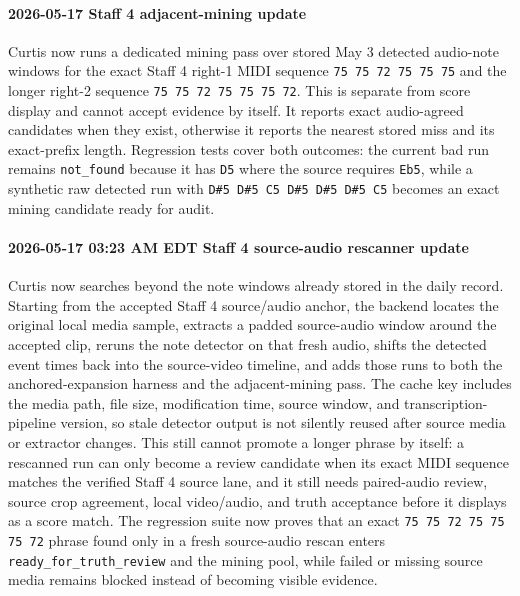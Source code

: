 \paragraph{2026-05-17 Staff 4 adjacent-mining update} Curtis now runs a dedicated mining pass over stored May 3 detected audio-note windows for the exact Staff 4 right-1 MIDI sequence \texttt{75 75 72 75 75 75} and the longer right-2 sequence \texttt{75 75 72 75 75 75 72}. This is separate from score display and cannot accept evidence by itself. It reports exact audio-agreed candidates when they exist, otherwise it reports the nearest stored miss and its exact-prefix length. Regression tests cover both outcomes: the current bad run remains \texttt{not\_found} because it has \texttt{D5} where the source requires \texttt{Eb5}, while a synthetic raw detected run with \texttt{D\#5 D\#5 C5 D\#5 D\#5 D\#5 C5} becomes an exact mining candidate ready for audit.

\paragraph{2026-05-17 03:23 AM EDT Staff 4 source-audio rescanner update} Curtis now searches beyond the note windows already stored in the daily record. Starting from the accepted Staff 4 source/audio anchor, the backend locates the original local media sample, extracts a padded source-audio window around the accepted clip, reruns the note detector on that fresh audio, shifts the detected event times back into the source-video timeline, and adds those runs to both the anchored-expansion harness and the adjacent-mining pass. The cache key includes the media path, file size, modification time, source window, and transcription-pipeline version, so stale detector output is not silently reused after source media or extractor changes. This still cannot promote a longer phrase by itself: a rescanned run can only become a review candidate when its exact MIDI sequence matches the verified Staff 4 source lane, and it still needs paired-audio review, source crop agreement, local video/audio, and truth acceptance before it displays as a score match. The regression suite now proves that an exact \texttt{75 75 72 75 75 75 72} phrase found only in a fresh source-audio rescan enters \texttt{ready\_for\_truth\_review} and the mining pool, while failed or missing source media remains blocked instead of becoming visible evidence.

